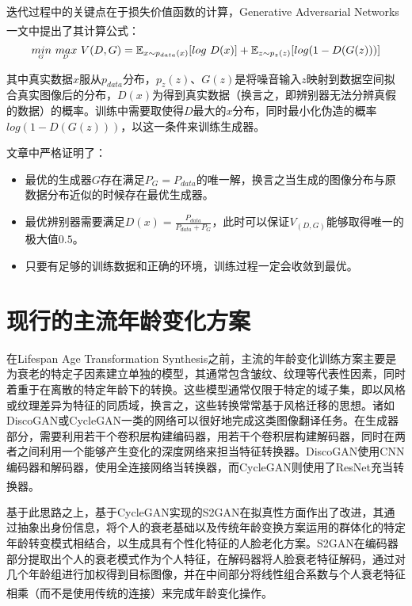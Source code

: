 \documentclass[12pt,a4paper]{article}
\begin{document}
迭代过程中的关键点在于损失价值函数的计算，Generative Adversarial Networks一文中提出了其计算公式\textsuperscript{\cite{2014Generative}}：
\begin{align}
	\underaccent{G}{min}\ \underaccent{D}{max}\ V(D, G) = \mathbb{E}_{x \sim p_{data}(x)}[log\ D(x)] + \mathbb{E}_{z \sim p_{z}(z)}[log(1-D(G(z)))]
\end{align}


其中真实数据$x$服从$p_{data}$分布，$p_{z}(z)$、$G(z)$是将噪音输入$z$映射到数据空间拟合真实图像后的分布，$D(x)$为得到真实数据（换言之，即辨别器无法分辨真假的数据）的概率。训练中需要取使得$D$最大的$x$分布，同时最小化伪造的概率$log(1-D(G(z)))$，以这一条件来训练生成器。

文章中严格证明了：
\begin{itemize}[itemindent=2em]
	\item 最优的生成器$G$存在满足$P_G=P_{data}$的唯一解，换言之当生成的图像分布与原数据分布近似的时候存在最优生成器。
	\item 最优辨别器需要满足$D(x)=\frac{P_{data}}{P_{data}+P_G}$，此时可以保证$V_(D,G)$能够取得唯一的极大值$0.5$。
	\item 只要有足够的训练数据和正确的环境，训练过程一定会收敛到最优。
\end{itemize}


\section{现行的主流年龄变化方案}
在Lifespan Age Transformation Synthesis之前，主流的年龄变化训练方案主要是为衰老的特定子因素建立单独的模型，其通常包含皱纹、纹理等代表性因素，同时着重于在离散的特定年龄下的转换。这些模型通常仅限于特定的域子集，即以风格或纹理差异为特征的同质域，换言之，这些转换常常基于风格迁移的思想。诸如DiscoGAN或CycleGAN一类的网络可以很好地完成这类图像翻译任务。在生成器部分，需要利用若干个卷积层构建编码器，用若干个卷积层构建解码器，同时在两者之间利用一个能够产生变化的深度网络来担当特征转换器。DiscoGAN使用CNN编码器和解码器，使用全连接网络当转换器，而CycleGAN则使用了ResNet充当转换器。\textsuperscript{\cite{2017Unpaired,2017Learning}}


基于此思路之上，基于CycleGAN实现的S2GAN在拟真性方面作出了改进，其通过抽象出身份信息，将个人的衰老基础以及传统年龄变换方案运用的群体化的特定年龄转变模式相结合，以生成具有个性化特征的人脸老化方案。S2GAN在编码器部分提取出个人的衰老模式作为个人特征，在解码器将人脸衰老特征解码，通过对几个年龄组进行加权得到目标图像，并在中间部分将线性组合系数与个人衰老特征相乘（而不是使用传统的连接）来完成年龄变化操作。\textsuperscript{\cite{2020S2GAN}}
\end{document}
